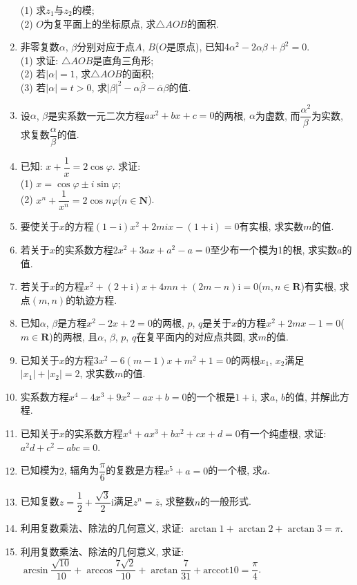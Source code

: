 \documentclass[10pt,a4paper]{article}
\begin{document}
\begin{enumerate}[1.]
(1) 求$z_1$与$z_2$的模;\\
(2) $O$为复平面上的坐标原点, 求$\triangle AOB$的面积.
\item 非零复数$\alpha$, $\beta$分别对应于点$A$, $B$($O$是原点), 已知$4\alpha ^2-2\alpha \beta +\beta ^2=0$.\\
(1) 求证: $\triangle AOB$是直角三角形;\\
(2) 若$|\alpha|=1$, 求$\triangle AOB$的面积;\\
(3) 若$|\alpha|=t>0$, 求$|\beta|^2-\alpha \overline \beta -\overline \alpha \beta$的值.
\item 设$\alpha$, $\beta$是实系数一元二次方程$ax^2+bx+c=0$的两根, $\alpha$为虚数, 而$\dfrac{{{\alpha }^2}}{\beta }$为实数, 求复数$\dfrac{\alpha }{\beta }$的值.
\item 已知: $x+\dfrac 1x=2\cos \varphi$. 求证:\\
(1) $x=\cos \varphi \pm i\sin \varphi$;\\
(2) $x^n+\dfrac 1{x^n}=2\cos n\varphi$($n\in \mathbf{N}$).
\item 要使关于$x$的方程$(1-\mathrm{i})x^2+2mix-(1+\mathrm{i})=0$有实根, 求实数$m$的值.\\
\item 若关于$x$的实系数方程$2x^2+3ax+a^2-a=0$至少布一个模为1的根, 求实数$a$的值.
\item 若关于$x$的方程$x^2+(2+\mathrm{i})x+4mn+(2m-n)\mathrm{i}=0$($m,n\in \mathbf{R}$)有实根, 求点$(m,n)$的轨迹方程.
\item 已知$\alpha$, $\beta$是方程$x^2-2x+2=0$的两根, $p$, $q$是关于$x$的方程$x^2+2mx-1=0$($m\in \mathbf{R}$)的两根, 且$\alpha$, $\beta$, $p$, $q$在复平面内的对应点共圆, 求$m$的值.
\item 已知关于$x$的方程$3x^2-6(m-1)x+m^2+1=0$的两根$x_1$, $x_2$满足$|x_1|+|x_2|=2$, 求实数$m$的值.
\item 实系数方程$x^4-4x^3+9x^2-ax+b=0$的一个根是$1+\mathrm{i}$, 求$a$, $b$的值, 并解此方程.
\item 已知关于$x$的实系数方程$x^4+ax^3+bx^2+cx+d=0$有一个纯虚根, 求证: $a^2d+c^2-abc=0$.
\item 已知模为$2$, 辐角为$\dfrac{\pi }6$的复数是方程$x^5+a=0$的一个根, 求$a$.
\item 已知复数$z=\dfrac 12+\dfrac{\sqrt 3}2\mathrm{i}$满足$z^n=\overline z$, 求整数$n$的一般形式.
\item 利用复数乘法、除法的几何意义, 求证: $\arctan 1+\arctan 2+\arctan 3=\pi$.
\item 利用复数乘法、除法的几何意义, 求证: $\arcsin \dfrac{\sqrt {10}}{10}+\arccos \dfrac{7\sqrt 2}{10}+\arctan \dfrac 7{31}+\mathrm{arccot} 10=\dfrac{\pi }4$.

\end{enumerate}
\end{document}
